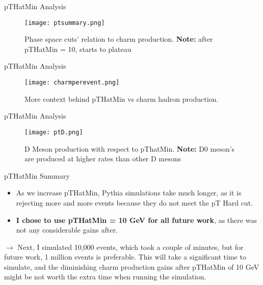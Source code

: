 \documentclass[10pt]{beamer}
\begin{document}
\begin{frame}{pTHatMin Analysis}

\begin{figure}
    \centering
    \texttt{[image: ptsummary.png]}
    \caption{Phase space cuts' relation to charm production. \textbf{Note:} after pTHatMin = 10, starts to plateau}
    \label{fig:ptsummary}
\end{figure}
    
\end{frame}

\begin{frame}{pTHatMin Analysis}

\begin{figure}
    \centering
    \texttt{[image: charmperevent.png]}
    \caption{More context behind pTHatMin vs charm hadron production.}
    \label{fig:ptcharmperevent}
\end{figure}
    
\end{frame}

\begin{frame}{pTHatMin Analysis}

\begin{figure}
    \centering
    \texttt{[image: ptD.png]}
    \caption{D Meson production with respect to pThatMin. \textbf{Note:} D0 meson's are produced at higher rates than other D mesons}
    \label{fig:ptsummary}
\end{figure}
    
\end{frame}

\begin{frame}{pTHatMin Summary}

\begin{itemize}
    \item As we increase pTHatMin, Pythia simulations take much longer, as it is rejecting more and more events because they do not meet the pT Hard cut. 

    \item \textbf{I chose to use pTHatMin = 10 GeV for all future work}, as there was not any considerable gains after.
\end{itemize}

$\rightarrow$ Next, I simulated 10,000 events, which took a couple of minutes, but for future work, 1 million events is preferable. This will take a significant time to simulate, and the diminishing charm production gains after pTHatMin of 10 GeV might be not worth the extra time when running the simulation.
    
\end{frame}
\end{document}
